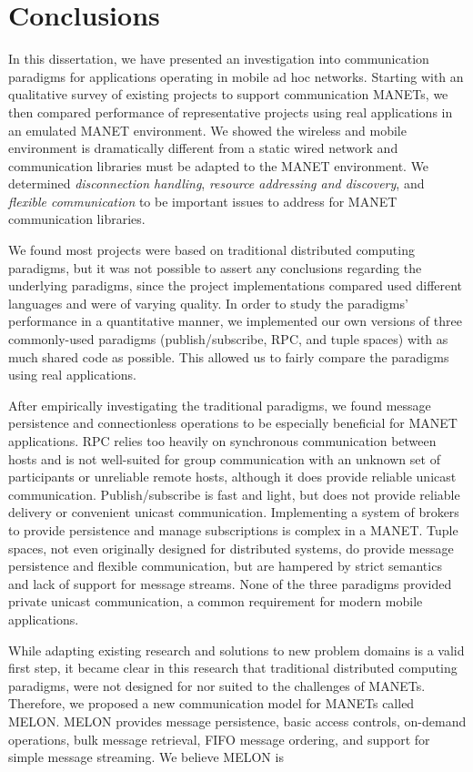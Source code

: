 \chapter{Conclusions}\label{chapter:conclusions}

In this dissertation, we have presented an investigation into communication paradigms for applications operating in mobile ad hoc networks. Starting with an qualitative survey of existing projects to support communication MANETs, we then compared performance of representative projects using real applications in an emulated MANET environment. We showed the wireless and mobile environment is dramatically different from a static wired network and communication libraries must be adapted to the MANET environment. We determined \textit{disconnection handling}, \textit{resource addressing and discovery}, and \textit{flexible communication} to be important issues to address for MANET communication libraries.

We found most projects were based on traditional distributed computing paradigms, but it was not possible to assert any conclusions regarding the underlying paradigms, since the project implementations compared used different languages and were of varying quality. In order to study the paradigms' performance in a quantitative manner, we implemented our own versions of three commonly-used paradigms (publish/subscribe, RPC, and tuple spaces) with as much shared code as possible. This allowed us to fairly compare the paradigms using real applications.

After empirically investigating the traditional paradigms, we found message persistence and connectionless operations to be especially beneficial for MANET applications. RPC relies too heavily on synchronous communication between hosts and is not well-suited for group communication with an unknown set of participants or unreliable remote hosts, although it does provide reliable unicast communication. Publish/subscribe is fast and light, but does not provide reliable delivery or convenient unicast communication. Implementing a system of brokers to provide persistence and manage subscriptions is complex in a MANET. Tuple spaces, not even originally designed for distributed systems, do provide message persistence and flexible communication, but are hampered by strict semantics and lack of support for message streams. None of the three paradigms provided private unicast communication, a common requirement for modern mobile applications.

While adapting existing research and solutions to new problem domains is a valid first step, it became clear in this research that traditional distributed computing paradigms, were not designed for nor suited to the challenges of MANETs. Therefore, we proposed a new communication model for MANETs called MELON. MELON provides message persistence, basic access controls, on-demand operations, bulk message retrieval, FIFO message ordering, and support for simple message streaming. We believe MELON is 

